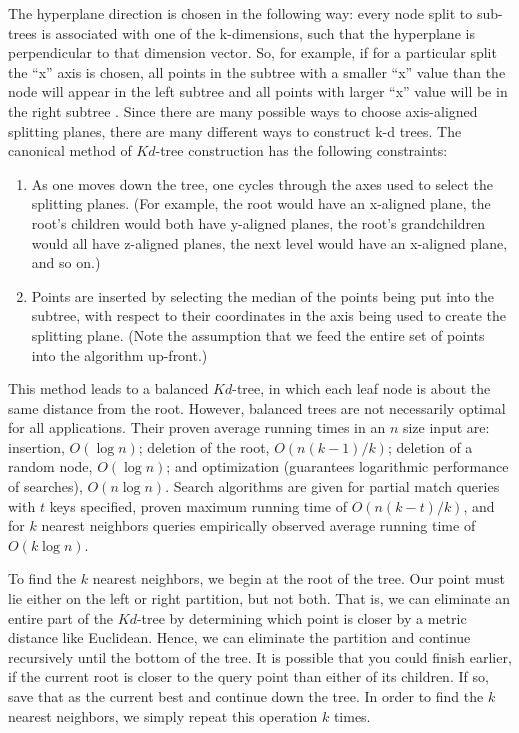 \documentclass[]{IEEEtran}
\begin{document}
  The hyperplane direction is chosen in the following way: every node split to sub-trees is associated with one of the k-dimensions, such that the hyperplane is perpendicular to that dimension vector. So, for example, if for a particular split the ``x'' axis is chosen, all points in the subtree with a smaller ``x'' value than the node will appear in the left subtree and all points with larger ``x'' value will be in the right subtree \cite{kd_tree}.
  Since there are many possible ways to choose axis-aligned splitting planes, there are many different ways to construct k-d trees. The canonical method of $Kd$-tree construction has the following constraints\cite{comp_geo}:
    \begin{enumerate}
      \item As one moves down the tree, one cycles through the axes used to select the splitting planes. (For example, the root would have an x-aligned plane, the root's children would both have y-aligned planes, the root's grandchildren would all have z-aligned planes, the next level would have an x-aligned plane, and so on.)
      \item Points are inserted by selecting the median of the points being put into the subtree, with respect to their coordinates in the axis being used to create the splitting plane. (Note the assumption that we feed the entire set of points into the algorithm up-front.)
    \end{enumerate}
  This method leads to a balanced $Kd$-tree, in which each leaf node is about the same distance from the root. However, balanced trees are not necessarily optimal for all applications. Their proven average running times in an $n$ size input are: insertion, $O(\log n)$; deletion of the root, $O(n (k-1)/k)$; deletion of a random node, $O(\log n)$; and optimization (guarantees logarithmic performance of searches), $O(n \log n)$. Search algorithms are given for partial match queries with $t$ keys specified, proven maximum running time of $O(n (k-t)/k)$, and for $k$ nearest neighbors queries empirically observed average running time of $O(k \log n)$\cite{kd_tree}.

  To find the $k$ nearest neighbors, we begin at the root of the tree. Our point must lie either on the left or right partition, but not both. That is, we can eliminate an entire part of the $Kd$-tree by determining which point is closer by a metric distance like Euclidean. Hence, we can eliminate the partition and continue recursively until the bottom of the tree. It is possible that you could finish earlier, if the current root is closer to the query point than either of its children. If so, save that as the current best and continue down the tree. In order to find the $k$ nearest neighbors, we simply repeat this operation $k$ times.
\end{document}
